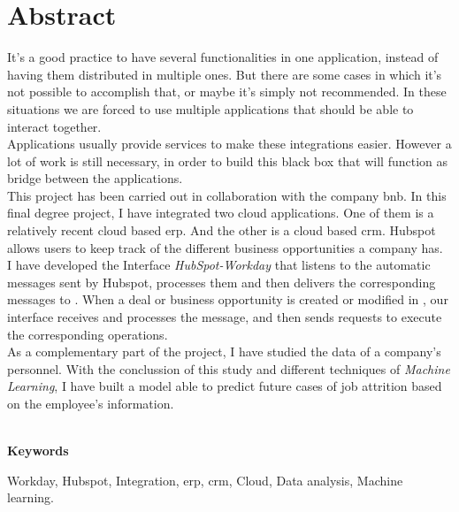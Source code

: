 \chapter*{Abstract}
	
	It's a good practice to have several functionalities in one application, instead of having them distributed in multiple ones. But there are some cases in which
	it’s not possible to accomplish that, or maybe it's simply not recommended. In these situations we are
	forced to use multiple applications that should be able to interact together.\\

	Applications usually provide services to make these integrations easier. However a lot of work is still necessary, in order to build this black box that will function as bridge between the applications.\\
	
	This project has been carried out in collaboration with the company \acrfull{bnb}. In this final degree project, I have integrated two cloud applications. One of
	them is \wday{} a relatively recent cloud based \acrshort{erp}. And the other is \hs{} a cloud based \acrshort{crm}.
	Hubspot allows users to keep track of the different business opportunities a company has.\\
	
	I have developed the Interface \textit{HubSpot-Workday} that listens to the automatic messages sent by Hubspot,
	processes them and then delivers the corresponding messages to \wday{}. When a deal or business
	opportunity is created or modified in \hs{}, our interface receives and processes the message, and then sends \wday{} requests to execute the corresponding operations.\\

	As a complementary part of the project, I have studied the data of a company’s personnel. 
	With the conclussion of this study and different techniques of \textit{Machine Learning}, I have
	built a model able to predict future cases of job attrition based on the employee's information.\\

	
	
	
	\
	
	\textbf{Keywords}
    
    Workday, Hubspot, Integration, \acrfull{erp}, \acrfull{crm}, Cloud, Data analysis, Machine learning.
	
	
